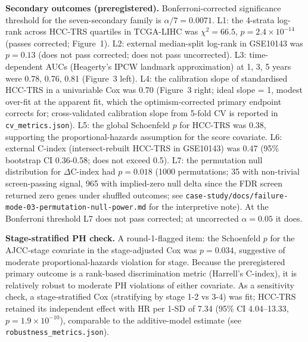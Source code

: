 \documentclass[12pt]{article}
\newcommand{\HCCRTS}{HCC-TRS\xspace}
\begin{document}
\textbf{Secondary outcomes (preregistered).}
Bonferroni-corrected significance threshold for the seven-secondary
family is $\alpha / 7 = 0.0071$. L1: the 4-strata log-rank across
\HCCRTS quartiles in TCGA-LIHC was $\chi^2 = 66.5$, $p = 2.4 \times
10^{-14}$ (passes corrected; Figure~1). L2: external median-split
log-rank in GSE10143 was $p = 0.13$ (does not pass corrected; does
not pass uncorrected). L3: time-dependent AUCs (Heagerty's IPCW
landmark approximation) at 1, 3, 5 years were 0.78, 0.76, 0.81
(Figure~3 left). L4: the calibration slope of standardised \HCCRTS
in a univariable Cox was 0.70 (Figure~3 right; ideal slope = 1,
modest over-fit at the apparent fit, which the optimism-corrected
primary endpoint corrects for; cross-validated calibration slope
from 5-fold CV is reported in \texttt{cv\_metrics.json}). L5: the
global Schoenfeld $p$ for \HCCRTS was 0.38, supporting the
proportional-hazards assumption for the score covariate. L6:
external C-index (intersect-rebuilt \HCCRTS in GSE10143) was 0.47
(95\% bootstrap CI 0.36-0.58; does not exceed 0.5). L7: the
permutation null distribution for $\Delta$C-index had $p = 0.018$
(1000 permutations; 35 with non-trivial screen-passing signal, 965
with implied-zero null delta since the FDR screen returned zero
genes under shuffled outcomes; see
\texttt{case-study/docs/failure-mode-03-permutation-null-power.md}
for the interpretive note). At the Bonferroni threshold L7 does not
pass corrected; at uncorrected $\alpha = 0.05$ it does.

\textbf{Stage-stratified PH check.} A round-1-flagged item: the
Schoenfeld $p$ for the AJCC-stage covariate in the stage-adjusted
Cox was $p = 0.034$, suggestive of moderate proportional-hazards
violation for stage. Because the preregistered primary outcome
is a rank-based discrimination metric (Harrell's C-index), it is
relatively robust to moderate PH violations of either covariate.
As a sensitivity check, a stage-stratified Cox (stratifying by
stage 1-2 vs 3-4) was fit; HCC-TRS retained its independent effect
with HR per 1-SD of 7.34 (95\% CI 4.04--13.33, $p = 1.9 \times
10^{-10}$), comparable to the additive-model estimate (see
\texttt{robustness\_metrics.json}).
\end{document}
